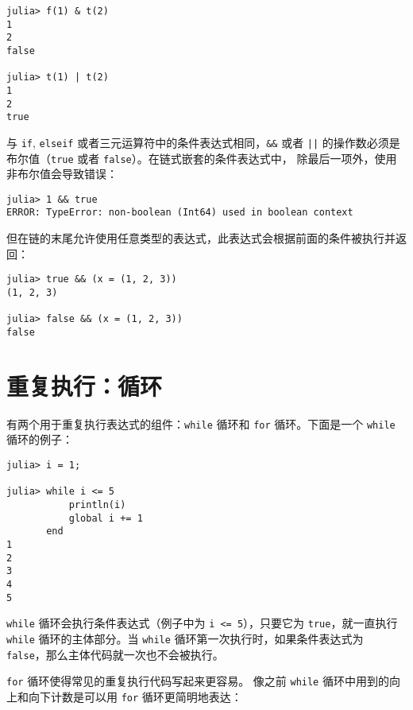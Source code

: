 \begin{verbatim}
julia> f(1) & t(2)
1
2
false

julia> t(1) | t(2)
1
2
true
\end{verbatim}



与 \texttt{if}, \texttt{elseif} 或者三元运算符中的条件表达式相同，\texttt{\&\&} 或者 \texttt{||} 的操作数必须是布尔值（\texttt{true} 或者 \texttt{false}）。在链式嵌套的条件表达式中， 除最后一项外，使用非布尔值会导致错误：




\begin{verbatim}
julia> 1 && true
ERROR: TypeError: non-boolean (Int64) used in boolean context
\end{verbatim}



但在链的末尾允许使用任意类型的表达式，此表达式会根据前面的条件被执行并返回：




\begin{verbatim}
julia> true && (x = (1, 2, 3))
(1, 2, 3)

julia> false && (x = (1, 2, 3))
false
\end{verbatim}



\hypertarget{6800841505698205300}{}


\section{重复执行：循环}



有两个用于重复执行表达式的组件：\texttt{while} 循环和 \texttt{for} 循环。下面是一个 \texttt{while} 循环的例子：




\begin{verbatim}
julia> i = 1;

julia> while i <= 5
           println(i)
           global i += 1
       end
1
2
3
4
5
\end{verbatim}



\texttt{while} 循环会执行条件表达式（例子中为 \texttt{i <= 5}），只要它为 \texttt{true}，就一直执行\texttt{while} 循环的主体部分。当 \texttt{while} 循环第一次执行时，如果条件表达式为 \texttt{false}，那么主体代码就一次也不会被执行。



\texttt{for} 循环使得常见的重复执行代码写起来更容易。 像之前 \texttt{while} 循环中用到的向上和向下计数是可以用 \texttt{for} 循环更简明地表达：




